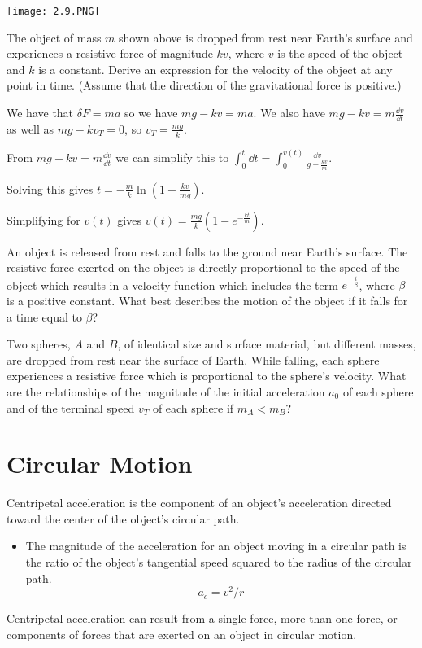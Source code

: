\documentclass[../mech.tex]{subfiles}
\begin{document}
\begin{example}
    \begin{center}
        \texttt{[image: 2.9.PNG]}
    \end{center}
    The object of mass $m$ shown above is dropped from rest near Earth's surface and experiences a resistive force of magnitude $kv$, where $v$ is the speed of the object and $k$ is a constant. Derive an expression for the velocity of the object at any point in time. (Assume that the direction of the gravitational force is positive.)

    We have that $\delta F = ma$ so we have $mg-kv=ma$. We also have $mg-kv=m\frac{\dd v}{\dd t}$ as well as $mg-kv_T=0$, so $v_T = \frac{mg}{k}$.

    From $mg-kv=m\frac{\dd v}{\dd t}$ we can simplify this to $\int_0^t \dd t = \int_0^{v(t)} \frac{\dd v}{g-\frac{kv}{m}}$.

    Solving this gives $t=-\frac{m}{k}\ln(1-\frac{kv}{mg})$.

    Simplifying for $v(t)$ gives $v(t)= \frac{mg}{k}\left(1-e^{-\frac{kt}{m}}\right)$.
\end{example}

\ex An object is released from rest and falls to the ground near Earth's surface. The resistive force exerted on the object is directly proportional to the speed of the object which results 
in a velocity function which includes the term $e^{-\frac{t}{\beta}}$, where $\beta$ is a positive constant. What best describes the motion of the object if it falls for a time equal to $\beta$?

\ex Two spheres, $A$ and $B$, of identical size and surface material, but different masses, are dropped from rest near the surface of Earth. While falling, each sphere experiences a resistive force which is proportional 
to the sphere's velocity. What are the relationships of the magnitude of the initial acceleration $a_0$ of each sphere and of the terminal speed $v_T$ of each sphere if $m_A<m_B$?

\section{Circular Motion}
Centripetal acceleration is the component of an object's acceleration directed toward the center of the object's circular path.
\begin{itemize}
    \item The magnitude of the acceleration for an object moving in a circular path is the ratio of the object's tangential speed squared to the radius of the circular path.
    \[ a_c=v^2/r \]
\end{itemize}
Centripetal acceleration can result from a single force, more than one force, or components of forces that are exerted on an object in circular motion.
\end{document}
